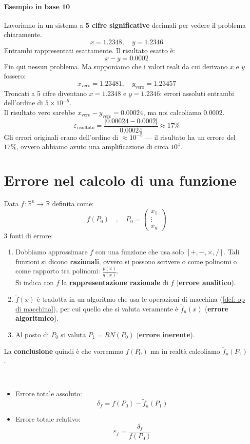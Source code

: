 \documentclass[12pt,a4paper,]{report}
\begin{document}
\paragraph{Esempio in base 10}
Lavoriamo in un sistema a \textbf{5 cifre significative} decimali per vedere il problema chiaramente.
\[
x = 1.2348, \quad y = 1.2346
\]
Entrambi rappresentati esattamente. Il risultato esatto è:
\[
x - y = 0.0002
\]
Fin qui nessun problema. Ma supponiamo che i valori reali da cui derivano $x$ e $y$ fossero:
\[
x_{\text{vero}} = 1.23481, \quad y_{\text{vero}} = 1.23457
\]
Troncati a 5 cifre diventano $x = 1.2348$ e $y = 1.2346$: errori assoluti entrambi dell'ordine di $5 \times 10^{-5}$.
\\
Il risultato vero sarebbe $x_{\text{vero}} - y_{\text{vero}} = 0.00024$, ma noi calcoliamo $0.0002$.
\[
\varepsilon_{\text{risultato}} = \frac{|0.00024 - 0.0002|}{0.00024} \approx 17\%
\]
Gli errori originali erano dell'ordine di $\approx 10^{-5}$ --- il risultato ha un errore del $17\%$, ovvero abbiamo avuto una amplificazione di circa $10^4$.


\section{Errore nel calcolo di una funzione}
Data $f:\mathbb{R}^n\to\mathbb{R}$ definita come:
\[
f(P_0)\quad , \quad P_0=
\begin{pmatrix}
    x_1\\
    \vdots\\
    x_n
\end{pmatrix}
\]
3 fonti di errore:
\begin{enumerate}
    \item Dobbiamo approssimare $f$ con una funzione che usa solo $[+, -, \times, /]$. Tali funzioni si dicono \textbf{razionali}, ovvero si possono scrivere o come polinomi o come rapporto tra polinomi: $\frac{p(x)}{q(x)}$.\\
    Si indica con $\tilde{f}$ la \textbf{rappresentazione razionale} di $f$ (\textbf{errore analitico}).
    \item $\tilde{f}(x)$ è tradotta in un algoritmo che usa le operazioni di macchina (\autoref{def: op di macchina}), per cui quello che si valuta veramente è $\tilde{f}_a(x)$ (\textbf{errore algoritmico}).
    \item Al posto di $P_0$ si valuta $P_1 = RN(P_0)$ (\textbf{errore inerente}).
\end{enumerate}
La \textbf{conclusione} quindi è che vorremmo $f(P_0)$ ma in realtà calcoliamo $\tilde{f}_a(P_1)$.
\begin{definizione}
    $ $
    \begin{itemize}
        \item Errore totale assoluto:
        $$\delta_f = f(P_0) - \tilde{f}_a(P_1)$$
        \item Errore totale relativo:
        \[
        \varepsilon_f = \frac{\delta_f}{f(P_0)}
        \]
    \end{itemize}
\end{definizione}
\end{document}
